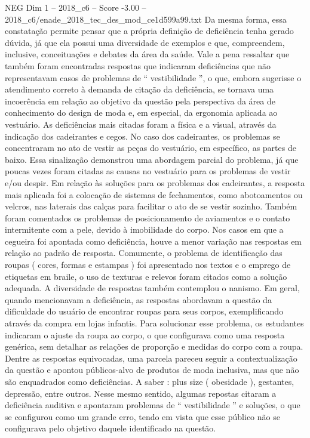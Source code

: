 \begin{textsample}{NEG Dim 1 – 2018\_c6 – Score -3.00 – 2018\_c6/enade\_2018\_tec\_des\_mod\_ce1d599a99.txt}
Da mesma forma, essa constatação permite pensar que a própria definição de deficiência tenha gerado dúvida, já que ela possui uma diversidade de exemplos e que, compreendem, inclusive, conceituações e debates da área da saúde.
Vale a pena ressaltar que também foram encontradas respostas que indicaram deficiências que não representavam casos de problemas de “ vestibilidade ”, o que, embora sugerisse o atendimento correto à demanda de citação da deficiência, se tornava uma incoerência em relação ao objetivo da questão pela perspectiva da área de conhecimento do design de moda e, em especial, da ergonomia aplicada ao vestuário.
As deficiências mais citadas foram a física e a visual, através da indicação dos cadeirantes e cegos.
No caso dos cadeirantes, os problemas se concentraram no ato de vestir as peças do vestuário, em específico, as partes de baixo.
Essa sinalização demonstrou uma abordagem parcial do problema, já que poucas vezes foram citadas as causas no vestuário para os problemas de vestir e/ou despir.
Em relação às soluções para os problemas dos cadeirantes, a resposta mais aplicada foi a colocação de sistemas de fechamentos, como abotoamentos ou velcros, nas laterais das calças para facilitar o ato de se vestir sozinho.
Também foram comentados os problemas de posicionamento de aviamentos e o contato intermitente com a pele, devido à imobilidade do corpo.
Nos casos em que a cegueira foi apontada como deficiência, houve a menor variação nas respostas em relação ao padrão de resposta.
Comumente, o problema de identificação das roupas ( cores, formas e estampas ) foi apresentado nos textos e o emprego de etiquetas em braile, o uso de texturas e relevos foram citados como a solução adequada.
A diversidade de respostas também contemplou o nanismo.
Em geral, quando mencionavam a deficiência, as respostas abordavam a questão da dificuldade do usuário de encontrar roupas para seus corpos, exemplificando através da compra em lojas infantis.
Para solucionar esse problema, os estudantes indicaram o ajuste da roupa ao corpo, o que configurava como uma resposta genérica, sem detalhar as relações de proporção e medidas do corpo com a roupa.
Dentre as respostas equivocadas, uma parcela pareceu seguir a contextualização da questão e apontou públicos-alvo de produtos de moda inclusiva, mas que não são enquadrados como deficiências.
A saber : plus size ( obesidade ), gestantes, depressão, entre outros.
Nesse mesmo sentido, algumas repostas citaram a deficiência auditiva e apontaram problemas de “ vestibilidade ” e soluções, o que se configurou como um grande erro, tendo em vista que esse público não se configurava pelo objetivo daquele identificado na questão.

\end{textsample}

